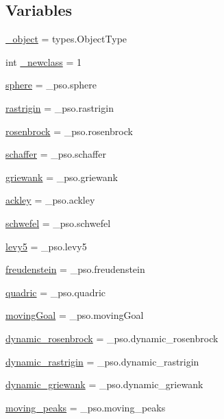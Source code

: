 \subsection*{Variables}
\begin{CompactItemize}
\item 
\hyperlink{namespacepso_abecf3f6e2c67638256b945a9d366f05}{\_\-object} = types.ObjectType
\item 
int \hyperlink{namespacepso_ded3b08752a6cab2f7301e0121c8e389}{\_\-newclass} = 1
\item 
\hyperlink{namespacepso_9ecebaa072fdd526c05ba3d4b1fbb521}{sphere} = \_\-pso.sphere
\item 
\hyperlink{namespacepso_b5880ea7f40f444b4960ea8bee95ff27}{rastrigin} = \_\-pso.rastrigin
\item 
\hyperlink{namespacepso_f4061b41c62a79c54502114c9f4621bb}{rosenbrock} = \_\-pso.rosenbrock
\item 
\hyperlink{namespacepso_069ef972a74aa5296743c4dd43564393}{schaffer} = \_\-pso.schaffer
\item 
\hyperlink{namespacepso_6c6b5942c2f03dbd9258829a0b318b11}{griewank} = \_\-pso.griewank
\item 
\hyperlink{namespacepso_72f1d0482cb8fb3e39e5a8dd02688b25}{ackley} = \_\-pso.ackley
\item 
\hyperlink{namespacepso_dace19a9d50557abf5314c401ae54b1a}{schwefel} = \_\-pso.schwefel
\item 
\hyperlink{namespacepso_f301b48b6f410ae22e69f494068b2b3a}{levy5} = \_\-pso.levy5
\item 
\hyperlink{namespacepso_bf220143e2eb844f88630a4d9643615a}{freudenstein} = \_\-pso.freudenstein
\item 
\hyperlink{namespacepso_fce08a0c16061b297dc1513a5133844c}{quadric} = \_\-pso.quadric
\item 
\hyperlink{namespacepso_b9537049c5b0c86bd134a371cca9ae4a}{movingGoal} = \_\-pso.movingGoal
\item 
\hyperlink{namespacepso_f151f744ceb3eeb56f4e35370c3a7ed5}{dynamic\_\-rosenbrock} = \_\-pso.dynamic\_\-rosenbrock
\item 
\hyperlink{namespacepso_f2ac7c7730307ae021e36600b4ca1acd}{dynamic\_\-rastrigin} = \_\-pso.dynamic\_\-rastrigin
\item 
\hyperlink{namespacepso_5a55d17d9e1b75c8363070d0fbbbc8b9}{dynamic\_\-griewank} = \_\-pso.dynamic\_\-griewank
\item 
\hyperlink{namespacepso_4a103e716c29578270c431d7bfc1bb42}{moving\_\-peaks} = \_\-pso.moving\_\-peaks

\end{CompactItemize}
